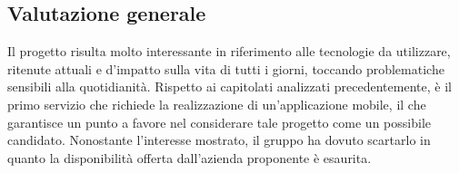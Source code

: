 \subsection{Valutazione generale}
Il progetto risulta molto interessante in riferimento alle tecnologie da utilizzare, ritenute attuali e d’impatto sulla vita di tutti i giorni, toccando problematiche sensibili alla quotidianità. Rispetto ai capitolati analizzati precedentemente, è il primo servizio che richiede la realizzazione di un’applicazione mobile, il che garantisce un punto a favore nel considerare tale progetto come un possibile candidato. 
Nonostante l’interesse mostrato, il gruppo ha dovuto scartarlo in quanto la disponibilità offerta dall’azienda proponente è esaurita.





